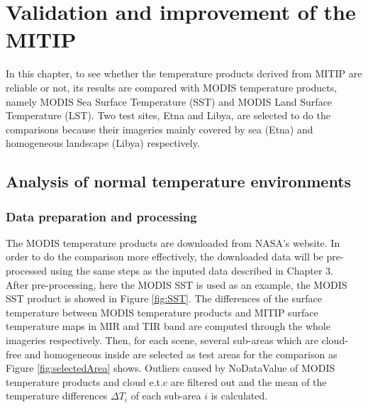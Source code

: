 \chapter{Validation and improvement of the MITIP}

\label{Chapter4}

In this chapter, to see whether the temperature products derived from MITIP are reliable or not, its results are compared with MODIS temperature products, namely MODIS Sea Surface Temperature (SST) and MODIS Land Surface Temperature (LST). Two test sites, Etna and Libya, are selected to do the comparisons because their imageries mainly covered by sea (Etna) and homogeneous landscape (Libya) respectively.\\


\section{Analysis of normal temperature environments}


\subsection{Data preparation and processing}
The MODIS temperature products are downloaded from NASA's website. In order to do the comparison more effectively, the downloaded data will be pre-processed using the same steps as the inputed data described in Chapter 3.\\

\noindent After pre-processing, here the MODIS SST is used as an example, the MODIS SST product is showed in Figure \ref{fig:SST}. The differences of the surface temperature between MODIS temperature products and MITIP surface temperature maps in MIR and TIR band are computed through the whole imageries respectively. Then, for each scene, several sub-areas which are cloud-free and homogeneous inside are selected as test areas for the comparison as Figure \ref{fig:selectedArea} shows. Outliers caused by NoDataValue of MODIS temperature products and cloud e.t.c are filtered out and the mean of the temperature differences $\Delta T_i$ of each sub-area $i$ is calculated.\\


